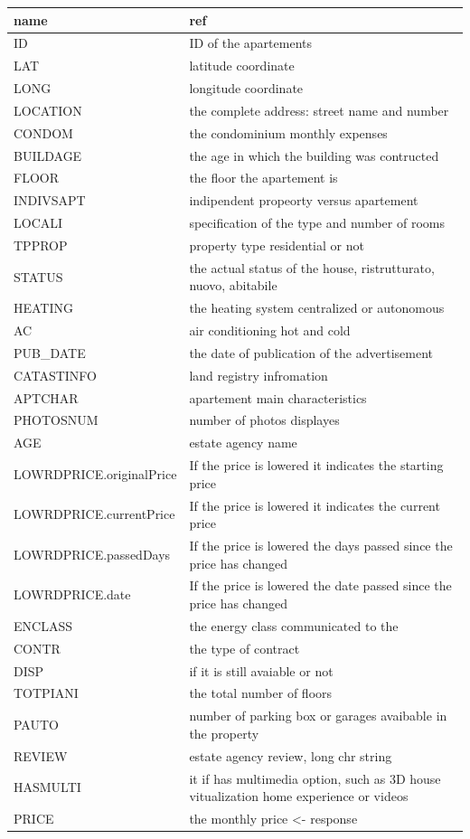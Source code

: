 \documentclass[
  12pt,
  a4paper,
  oneside]{book}
\theoremstyle{definition}
\theoremstyle{definition}
\theoremstyle{definition}
\theoremstyle{remark}
\begin{document}
\begin{longtable}{ll}
\toprule
name & ref\\
\midrule
ID & ID of the apartements\\
LAT & latitude coordinate\\
LONG & longitude coordinate\\
LOCATION & the complete address: street name and number\\
CONDOM & the condominium monthly expenses\\
\addlinespace
BUILDAGE & the age in which the building was contructed\\
FLOOR & the floor the apartement is\\
INDIVSAPT & indipendent propeorty versus apartement\\
LOCALI & specification of the type and number of rooms\\
TPPROP & property type residential or not\\
\addlinespace
STATUS & the actual status of the house, ristrutturato, nuovo, abitabile\\
HEATING & the heating system centralized or autonomous\\
AC & air conditioning hot and cold\\
PUB\_DATE & the date of publication of the advertisement\\
CATASTINFO & land registry infromation\\
\addlinespace
APTCHAR & apartement main characteristics\\
PHOTOSNUM & number of photos displayes\\
AGE & estate agency name\\
LOWRDPRICE.originalPrice & If the price is lowered it indicates the starting price\\
LOWRDPRICE.currentPrice & If the price is lowered it indicates the current price\\
\addlinespace
LOWRDPRICE.passedDays & If the price is lowered the days passed since the price has changed\\
LOWRDPRICE.date & If the price is lowered the date passed since the price has changed\\
ENCLASS & the energy class communicated to the\\
CONTR & the type of contract\\
DISP & if it is still avaiable or not\\
\addlinespace
TOTPIANI & the total number of floors\\
PAUTO & number of parking box or garages avaibable in the property\\
REVIEW & estate agency review, long chr string\\
HASMULTI & it if has multimedia option, such as 3D house vitualization home experience or videos\\
PRICE & the monthly price <- response\\
\bottomrule
\end{longtable}
\end{document}
